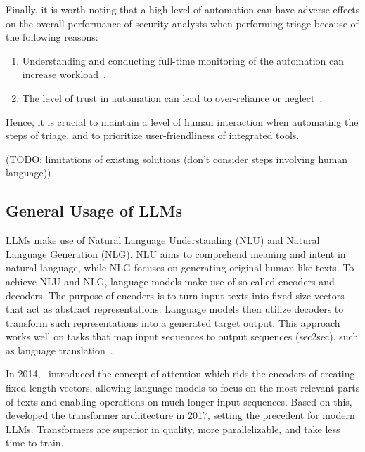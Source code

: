 Finally, it is worth noting that a high level of automation can have adverse effects on the overall performance of
security analysts when performing triage because of the following reasons:
\begin{enumerate}
    \item Understanding and conducting full-time monitoring of the automation can increase
    workload\ \citep{kaber2004effects}.
    \item The level of trust in automation can lead to over-reliance or neglect\ \citep{lee2004trust}.
\end{enumerate}
Hence, it is crucial to maintain a level of human interaction when automating the steps of triage, and to prioritize
user-friendliness of integrated tools.

(TODO: limitations of existing solutions (don't consider steps involving human language)) %

\subsection{General Usage of LLMs}
\label{subsec:rq1-use-of-llms}

LLMs make use of Natural Language Understanding (NLU) and Natural Language Generation (NLG).
NLU aims to comprehend meaning and intent in natural language, while NLG focuses on generating original human-like
texts.
To achieve NLU and NLG, language models make use of so-called encoders and decoders.
The purpose of encoders is to turn input texts into fixed-size vectors that act as abstract representations.
Language models then utilize decoders to transform such representations into a generated target output.
This approach works well on tasks that map input sequences to output sequences (sec2sec), such as language
translation\ \citep{sutskever2014sequence, cho2014learning}.

In 2014,\ \citet{bahdanau2014neural} introduced the concept of attention which rids the encoders of creating
fixed-length vectors, allowing language models to focus on the most relevant parts of texts and enabling operations on
much longer input sequences.
Based on this,\ \citet{vaswani2017attention} developed the transformer architecture in 2017, setting the precedent for
modern LLMs.
Transformers are superior in quality, more parallelizable, and take less time to train.

